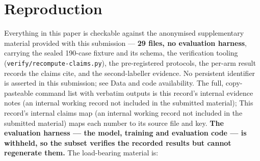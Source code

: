 \documentclass[10pt]{article}
\begin{document}
\section{Reproduction}

Everything in this paper is checkable against the anonymised supplementary material provided with this submission --- \textbf{29 files, no evaluation harness}, carrying the sealed 190-case fixture and its schema, the verification tooling (\texttt{verify/recompute-claims.py}), the pre-registered protocols, the per-arm result records the claims cite, and the second-labeller evidence. No persistent identifier is asserted in this submission; see Data and code availability. The full, copy-pasteable command list with verbatim outputs is this record's internal evidence notes (an internal working record not included in the submitted material); This record's internal claims map (an internal working record not included in the submitted material) maps each number to its source file and key. \textbf{The evaluation harness --- the model, training and evaluation code --- is withheld, so the subset verifies the recorded results but cannot regenerate them.} The load-bearing material is:
\end{document}
